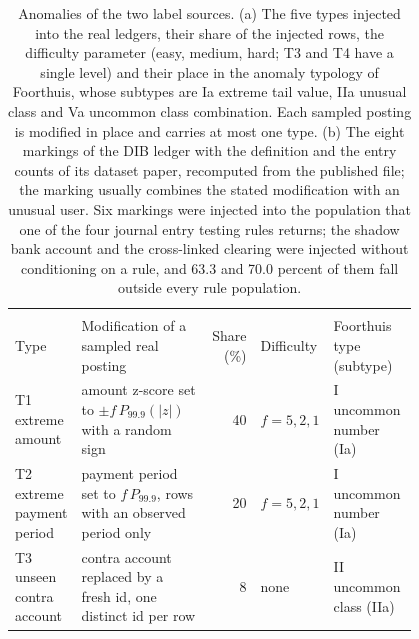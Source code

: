 

\begin{table}[tbp]
\caption{Anomalies of the two label sources. (a) The five types injected into the real ledgers, their share of the injected rows, the difficulty parameter (easy, medium, hard; T3 and T4 have a single level) and their place in the anomaly typology of Foorthuis, whose subtypes are Ia extreme tail value, IIa unusual class and Va uncommon class combination. Each sampled posting is modified in place and carries at most one type. (b) The eight markings of the DIB ledger with the definition and the entry counts of its dataset paper, recomputed from the published file; the marking usually combines the stated modification with an unusual user. Six markings were injected into the population that one of the four journal entry testing rules returns; the shadow bank account and the cross-linked clearing were injected without conditioning on a rule, and 63.3 and 70.0 percent of them fall outside every rule population.}
\label{tab:types}
\footnotesize
\setlength{\tabcolsep}{4pt}
\begin{tabular}{@{}>{\raggedright\arraybackslash}p{0.14\linewidth}>{\raggedright\arraybackslash}p{0.32\linewidth}r>{\raggedright\arraybackslash}p{0.13\linewidth}>{\raggedright\arraybackslash}p{0.21\linewidth}@{}}
\toprule
\multicolumn{5}{@{}l}{\textit{(a) Types injected into the real ledgers}} \\
\addlinespace
Type & Modification of a sampled real posting & \makecell[r]{Share\\(\%)} & Difficulty & Foorthuis type (subtype) \\
\midrule
T1 extreme amount & amount z-score set to $\pm f\,P_{99.9}(|z|)$ with a random sign & 40 & $f = 5, 2, 1$ & I uncommon number (Ia) \\
T2 extreme payment period & payment period set to $f\,P_{99.9}$, rows with an observed period only & 20 & $f = 5, 2, 1$ & I uncommon number (Ia) \\
T3 unseen contra account & contra account replaced by a fresh id, one distinct id per row & 8 & none & II uncommon class (IIa) \\

\end{tabular}
\end{table}
